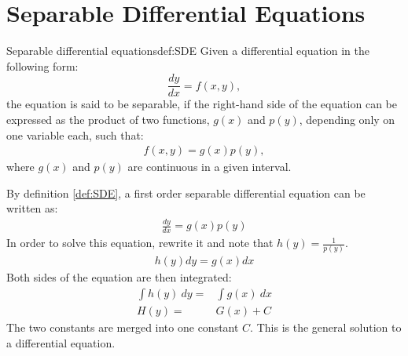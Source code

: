 \section{Separable Differential Equations}\label{SepDiff}
\begin{definition}{Separable differential equations}{def:SDE}
Given a differential equation in the following form: 
$$\frac{dy}{dx} = f(x,y),$$
the equation is said to be separable, if the right-hand side of the equation can be expressed as the product of two functions, $g(x)$ and $p(y)$, depending only on one variable each, such that:
\begin{align}
f(x,y)=g(x)p(y),
\end{align}
where $g(x)$ and $p(y)$ are continuous in a given interval.
\end{definition}
\noindent
By definition \ref{def:SDE}, a first order separable differential equation can be written as:
\begin{align}
	\frac{dy}{dx}=g(x)p(y)
\end{align}
In order to solve this equation, rewrite it and note that $h(y) = \frac{1}{p(y)}$.
\begin{align}
	h(y)dy=g(x)dx
\end{align}
Both sides of the equation are then integrated:
\begin{align}
\int h(y)\ dy =&\int g(x)\ dx   \\
H(y)=&G(x)+C \label{SDEG}
\end{align}
The two constants are merged into one constant $C$. This is the general solution to a differential equation. \cite{diffandcomplex}
